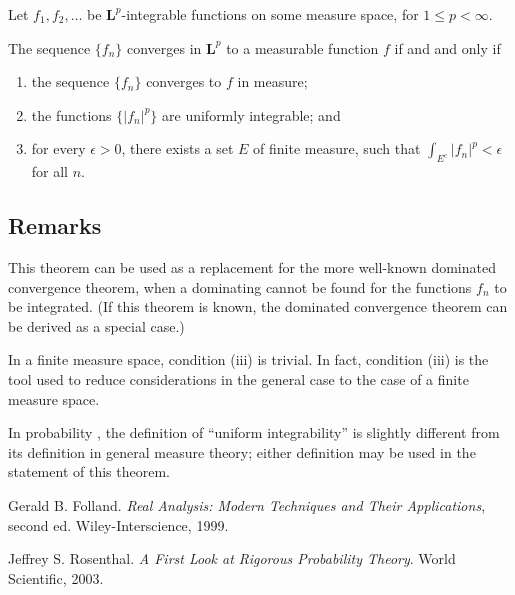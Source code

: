 \documentclass[12pt]{article}
\newcommand{\Le}{\mathbf{L}}
\providecommand{\abs}[1]{\lvert#1\rvert}
\begin{document}
Let $f_1, f_2, \dotsc$ be $\Le^p$-integrable functions on some measure space, for $1 \leq p < \infty$.

The sequence $\{ f_n \}$ converges in $\Le^p$ to a measurable function $f$ 
if and and only if

\begin{enumerate}[i]
\item
the sequence $\{ f_n \}$ converges to $f$ in measure;
\item
the functions $\{ \abs{f_n}^p \}$ are uniformly integrable; and
\item
for every $\epsilon > 0$, there exists a set $E$
of finite measure, such that $\int_{E^\mathrm{c}} \abs{f_n}^p < \epsilon$
for all $n$.
\end{enumerate}

\subsection*{Remarks}

This theorem can be used as a replacement for the more
well-known dominated convergence theorem, when a
dominating  cannot be found for the functions
$f_n$ to be integrated.
(If this theorem is known, the dominated convergence theorem
can be derived as a special case.)

In a finite measure space, condition (iii) is trivial.
In fact, condition (iii) is the tool used to reduce considerations
in the general case to the case of a finite measure space.

In probability , the definition of ``uniform integrability''
is slightly different from its definition in general measure theory;
either definition may be used in the statement of this theorem.

\begin{thebibliography}{3}
Gerald B. Folland. {\it Real Analysis: Modern Techniques and Their Applications}, second ed. Wiley-Interscience, 1999.

Jeffrey S. Rosenthal. {\it A First Look at Rigorous Probability Theory}.
World Scientific, 2003.
\end{thebibliography}

\end{document}
